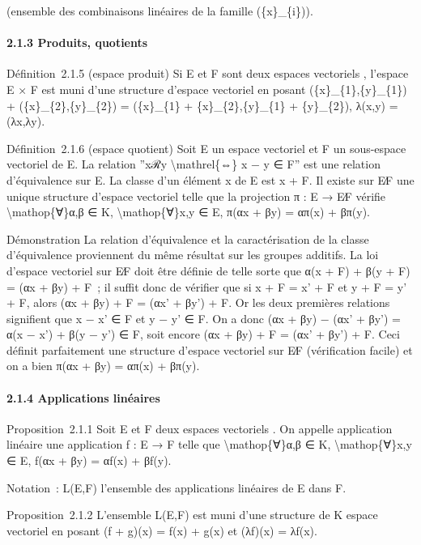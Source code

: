 \documentclass[]{article}
\begin{document}
(ensemble des combinaisons linéaires de la famille (\{x\}\_\{i\})).

\paragraph{2.1.3 Produits, quotients}

Définition~2.1.5 (espace produit) Si E et F sont deux espaces vectoriels
, l'espace E × F est muni d'une structure d'espace vectoriel en posant
(\{x\}\_\{1\},\{y\}\_\{1\}) + (\{x\}\_\{2\},\{y\}\_\{2\}) =
(\{x\}\_\{1\} + \{x\}\_\{2\},\{y\}\_\{1\} + \{y\}\_\{2\}), λ(x,y) =
(λx,λy).

Définition~2.1.6 (espace quotient) Soit E un espace vectoriel et F un
sous-espace vectoriel de E. La relation ''xℛy
\textbackslash{}mathrel\{⇔\} x − y ∈ F'' est une relation d'équivalence
sur E. La classe d'un élément x de E est x + F. Il existe sur E∕F une
unique structure d'espace vectoriel telle que la projection π : E → E∕F
vérifie \textbackslash{}mathop\{∀\}α,β ∈ K,
\textbackslash{}mathop\{∀\}x,y ∈ E, π(αx + βy) = απ(x) + βπ(y).

Démonstration La relation d'équivalence et la caractérisation de la
classe d'équivalence proviennent du même résultat sur les groupes
additifs. La loi d'espace vectoriel sur E∕F doit être définie de telle
sorte que α(x + F) + β(y + F) = (αx + βy) + F~; il suffit donc de
vérifier que si x + F = x' + F et y + F = y' + F, alors (αx + βy) + F =
(αx' + βy') + F. Or les deux premières relations signifient que x − x' ∈
F et y − y' ∈ F. On a donc (αx + βy) − (αx' + βy') = α(x − x') + β(y −
y') ∈ F, soit encore (αx + βy) + F = (αx' + βy') + F. Ceci définit
parfaitement une structure d'espace vectoriel sur E∕F (vérification
facile) et on a bien π(αx + βy) = απ(x) + βπ(y).

\paragraph{2.1.4 Applications linéaires}

Proposition~2.1.1 Soit E et F deux espaces vectoriels . On appelle
application linéaire une application f : E → F telle que
\textbackslash{}mathop\{∀\}α,β ∈ K, \textbackslash{}mathop\{∀\}x,y ∈ E,
f(αx + βy) = αf(x) + βf(y).

Notation~: L(E,F) l'ensemble des applications linéaires de E dans F.

Proposition~2.1.2 L'ensemble L(E,F) est muni d'une structure de K espace
vectoriel en posant (f + g)(x) = f(x) + g(x) et (λf)(x) = λf(x).
\end{document}
